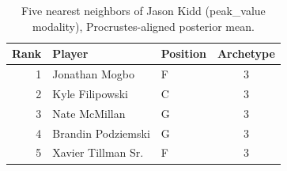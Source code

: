 \begin{table}[htbp]
  \centering\small
  \begin{tabular}{rllc}
    \toprule
    Rank & Player & Position & Archetype \\
    \midrule
    1 & Jonathan Mogbo & F & 3 \\
    2 & Kyle Filipowski & C & 3 \\
    3 & Nate McMillan & G & 3 \\
    4 & Brandin Podziemski & G & 3 \\
    5 & Xavier Tillman Sr. & F & 3 \\
    \bottomrule
  \end{tabular}
  \caption{Five nearest neighbors of Jason Kidd (peak_value modality), Procrustes-aligned posterior mean.}
  \label{tab:Jason_Kidd_neighbors_peak_value}
\end{table}

